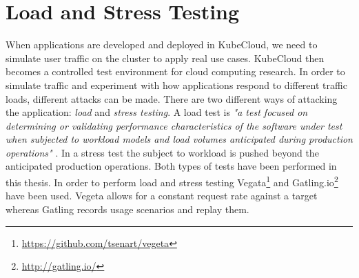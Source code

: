 
\section{Load and Stress Testing}
When applications are developed and deployed in KubeCloud, we need to simulate user traffic on the cluster to apply real use cases. KubeCloud then becomes a controlled test environment for cloud computing research. In order to simulate traffic and experiment with how applications respond to different traffic loads, different attacks can be made. There are two different ways of attacking the application: \textit{load} and \textit{stress testing}. A load test is \textit{"a test focused on determining or validating performance characteristics of the software under test when subjected to workload models and load volumes anticipated during production operations"} \cite{techtarget2016testing}. In a stress test the subject to workload is pushed beyond the anticipated production operations.
\noindent Both types of tests have been performed in this thesis. In order to perform load and stress testing Vegata\footnote{\url{https://github.com/tsenart/vegeta}} and Gatling.io\footnote{\url{http://gatling.io/}} have been used. Vegeta allows for a constant request rate against a target whereas Gatling records usage scenarios and replay them.